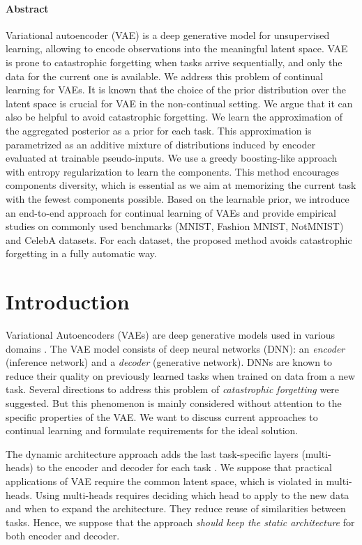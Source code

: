 \paragraph{Abstract}
Variational autoencoder (VAE) is a deep generative model for unsupervised learning, allowing to encode observations into the meaningful latent space. VAE is prone to catastrophic forgetting when tasks arrive sequentially, and only the data for the current one is available. We address this problem of continual learning for VAEs. It is known that the choice of the prior distribution over the latent space is crucial for VAE in the non-continual setting. We argue that it can also be helpful to avoid catastrophic forgetting. We learn the approximation of the aggregated posterior as a prior for each task. This approximation is parametrized as an additive mixture of distributions induced by encoder evaluated at trainable pseudo-inputs. We use a greedy boosting-like approach with entropy regularization to learn the components. This method encourages components diversity, which is essential as we aim at memorizing the current task with the fewest components possible. Based on the learnable prior, we introduce an end-to-end approach for continual learning of VAEs and provide empirical studies on commonly used benchmarks (MNIST, Fashion MNIST, NotMNIST) and CelebA datasets. For each dataset, the proposed method avoids catastrophic forgetting in a fully automatic way.

\newpage
\section{Introduction}
\label{intro}
Variational Autoencoders (VAEs) \citep{kingma2014autoencoding} are deep generative models used in various domains \citep{lee2017augmented, zhou2020unsupervised}. The VAE model consists of deep neural networks (DNN): an \textit{encoder} (inference network) and a \textit{decoder} (generative network). DNNs are known to reduce their quality on previously learned tasks when trained on data from a new task. Several directions to address this problem of \textit{catastrophic forgetting} were suggested. But this phenomenon is mainly considered without attention to the specific properties of the VAE. We want to discuss current approaches to continual learning and formulate requirements for the ideal solution. 

The dynamic architecture approach adds the last task-specific layers (multi-heads) to the encoder and decoder for each task \citep{rusu2016progressive, nguyen2017variational, li2018learning}. We suppose that practical applications of VAE require the common latent space, which is violated in multi-heads. Using multi-heads requires deciding which head to apply to the new data and when to expand the architecture. They reduce reuse of similarities between tasks. Hence, we suppose that the approach \textit{should keep the static architecture} for both encoder and decoder.

